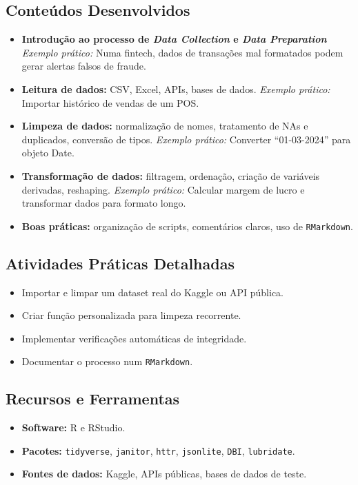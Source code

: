 \subsection{\textcolor{subsectionblue}{Conteúdos Desenvolvidos}}
\begin{itemize}
  \item \textbf{Introdução ao processo de \textit{Data Collection} e \textit{Data Preparation}}  
  \textit{Exemplo prático:} Numa fintech, dados de transações mal formatados podem gerar alertas falsos de fraude.
  \item \textbf{Leitura de dados:} CSV, Excel, APIs, bases de dados.  
  \textit{Exemplo prático:} Importar histórico de vendas de um POS.
  \item \textbf{Limpeza de dados:} normalização de nomes, tratamento de NAs e duplicados, conversão de tipos.  
  \textit{Exemplo prático:} Converter “01-03-2024” para objeto Date.
  \item \textbf{Transformação de dados:} filtragem, ordenação, criação de variáveis derivadas, reshaping.  
  \textit{Exemplo prático:} Calcular margem de lucro e transformar dados para formato longo.
  \item \textbf{Boas práticas:} organização de scripts, comentários claros, uso de \texttt{RMarkdown}.
\end{itemize}

\subsection{\textcolor{subsectionblue}{Atividades Práticas Detalhadas}}
\begin{itemize}
  \item Importar e limpar um dataset real do Kaggle ou API pública.
  \item Criar função personalizada para limpeza recorrente.
  \item Implementar verificações automáticas de integridade.
  \item Documentar o processo num \texttt{RMarkdown}.
\end{itemize}

\subsection{\textcolor{subsectionblue}{Recursos e Ferramentas}}
\begin{itemize}
  \item \textbf{Software:} R e RStudio.
  \item \textbf{Pacotes:} \texttt{tidyverse}, \texttt{janitor}, \texttt{httr}, \texttt{jsonlite}, \texttt{DBI}, \texttt{lubridate}.
  \item \textbf{Fontes de dados:} Kaggle, APIs públicas, bases de dados de teste.
\end{itemize}

